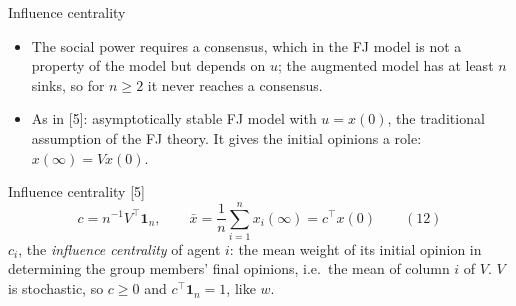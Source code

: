 \documentclass[10pt, aspectratio=169]{beamer}
\newcommand{\detailbuttons}[1]{%
  \begin{tikzpicture}[remember picture, overlay]
    \node[anchor=south east, inner sep=0pt] at ([xshift=-3mm, yshift=6mm]current page.south east) {#1};
  \end{tikzpicture}}
\newcommand{\go}[2]{\hyperlink{#1}{\beamergotobutton{#2}}}
\newcommand{\compactblocks}{\setbeamerfont{block title}{size=\small}}
\begin{document}
\begin{frame}[label=m-fj-centrality]{Influence centrality}
  \compactblocks
  \small
  \begin{itemize}
    \item The social power requires a consensus, which in the FJ model is not a property
          of the model but depends on $u$; the augmented model has at least $n$ sinks, so
          for $n \geq 2$ it never reaches a consensus.
    \item As in [5]: asymptotically stable FJ model with $u = x(0)$, the traditional
          assumption of the FJ theory. It gives the initial opinions a role:
          $x(\infty) = V x(0)$.
  \end{itemize}
  \begin{block}{Influence centrality [5]}
    \[ c = n^{-1} V^\top \mathbf{1}_n, \qquad
       \bar x = \frac{1}{n} \sum_{i=1}^{n} x_i(\infty) = c^\top x(0) \qquad (12) \]
    \footnotesize $c_i$, the \emph{influence centrality} of agent $i$: the mean weight of its
    initial opinion in determining the group members' final opinions, i.e.\ the mean of
    column $i$ of $V$. $V$ is stochastic, so $c \geq 0$ and $c^\top\mathbf{1}_n = 1$, like $w$.
  \end{block}
\end{frame}
\end{document}
